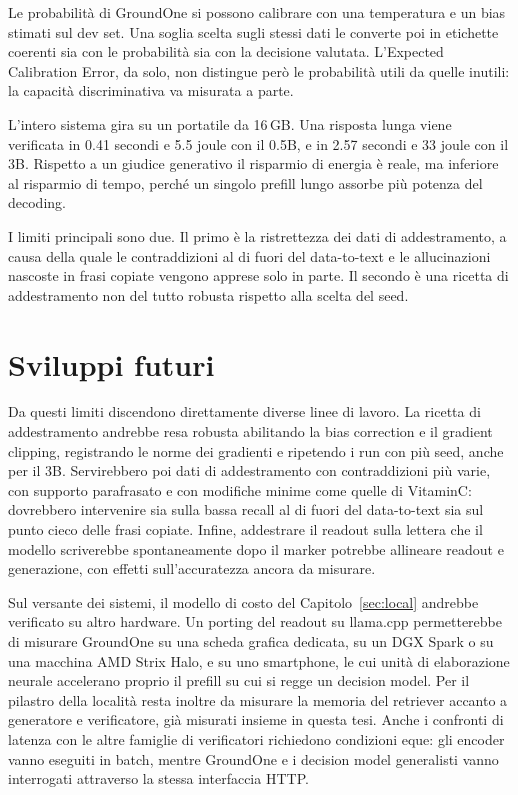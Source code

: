 Le probabilità di GroundOne si possono calibrare con una temperatura e un bias stimati sul dev set. Una soglia scelta
sugli stessi dati le converte poi in etichette coerenti sia con le probabilità sia con la decisione valutata.
L'Expected Calibration Error, da solo, non distingue però le probabilità utili da quelle inutili: la capacità
discriminativa va misurata a parte.

L'intero sistema gira su un portatile da 16\,GB. Una risposta lunga viene verificata in 0.41 secondi e 5.5 joule con il
0.5B, e in 2.57 secondi e 33 joule con il 3B. Rispetto a un giudice generativo il risparmio di energia è reale, ma
inferiore al risparmio di tempo, perché un singolo prefill lungo assorbe più potenza del decoding.

I limiti principali sono due. Il primo è la ristrettezza dei dati di addestramento, a causa della quale le
contraddizioni al di fuori del data-to-text e le allucinazioni nascoste in frasi copiate vengono apprese solo in parte.
Il secondo è una ricetta di addestramento non del tutto robusta rispetto alla scelta del seed.

\section{Sviluppi futuri}
\label{sec:concl-future}

Da questi limiti discendono direttamente diverse linee di lavoro. La ricetta di addestramento andrebbe resa robusta
abilitando la bias correction e il gradient clipping, registrando le norme dei gradienti e ripetendo i run con più seed,
anche per il 3B. Servirebbero poi dati di addestramento con contraddizioni più varie, con supporto parafrasato e con
modifiche minime come quelle di VitaminC: dovrebbero intervenire sia sulla bassa recall al di fuori del data-to-text sia
sul punto cieco delle frasi copiate. Infine, addestrare il readout sulla lettera che il modello scriverebbe
spontaneamente dopo il marker potrebbe allineare readout e generazione, con effetti sull'accuratezza ancora da misurare.

Sul versante dei sistemi, il modello di costo del Capitolo~\ref{sec:local} andrebbe verificato su altro hardware. Un
porting del readout su llama.cpp permetterebbe di misurare GroundOne su una scheda grafica dedicata, su un DGX Spark o
su una macchina AMD Strix Halo, e su uno smartphone, le cui unità di elaborazione neurale accelerano proprio il prefill
su cui si regge un decision model. Per il pilastro della località resta inoltre da misurare la memoria del retriever accanto a
generatore e verificatore, già misurati insieme in questa tesi. Anche i confronti di latenza con le altre famiglie di verificatori richiedono condizioni eque: gli encoder
vanno eseguiti in batch, mentre GroundOne e i decision model generalisti vanno interrogati attraverso la stessa interfaccia
HTTP.

